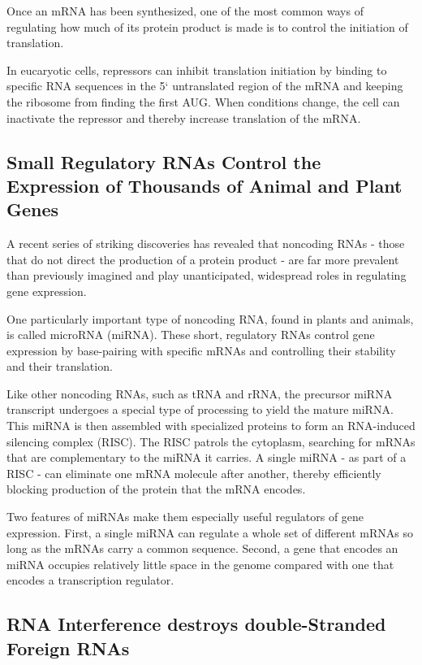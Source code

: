 Once an mRNA has been synthesized, one of the most common ways of
regulating how much of its protein product is made is to control the initiation of translation.

In eucaryotic cells, repressors can inhibit translation initiation by binding
to specific RNA sequences in the 5` untranslated region of the mRNA
and keeping the ribosome from finding the first AUG. When conditions
change, the cell can inactivate the repressor and thereby increase translation of the mRNA.

\subsection{Small Regulatory RNAs Control the Expression of Thousands of Animal and Plant Genes}

A recent series of striking discoveries has revealed
that noncoding RNAs - those that do not direct the production of a protein
product - are far more prevalent than previously imagined and play
unanticipated, widespread roles in regulating gene expression.

One particularly important type of noncoding RNA, found in plants and
animals, is called microRNA (miRNA). These short, regulatory RNAs control
gene expression by base-pairing with specific mRNAs and controlling
their stability and their translation.

Like other noncoding RNAs, such as tRNA and rRNA, the precursor
miRNA transcript undergoes a special type of processing to yield the
mature miRNA. This miRNA is then assembled with specialized proteins
to form an RNA-induced silencing complex (RISC). The RISC patrols the
cytoplasm, searching for mRNAs that are complementary to the miRNA
it carries. A single miRNA - as part of a RISC -
can eliminate one mRNA molecule after another, thereby efficiently
blocking production of the protein that the mRNA encodes.

Two features of miRNAs make them especially useful regulators of gene
expression. First, a single miRNA can regulate a whole set of different
mRNAs so long as the mRNAs carry a common sequence.
Second, a gene that encodes an miRNA occupies relatively little space in
the genome compared with one that encodes a transcription regulator.

\subsection{RNA Interference destroys double-Stranded Foreign RNAs}

